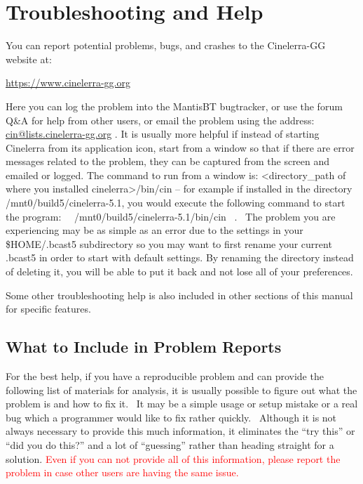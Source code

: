 \chapter{Troubleshooting and Help}%
\label{cha:troubleshooting_help}

You can report potential problems, bugs, and crashes to the Cinelerra-GG website at:
\medskip

\hspace{10mm}\href{https://www.cinelerra-gg.org/}{https://www.cinelerra-gg.org}
\medskip

Here you can log the problem into the MantisBT bugtracker, or use the forum Q\&A for help from other users, or email the
problem using the address: \href{mailto:cin@lists.cinelerra-gg.org}{cin@lists.cinelerra-gg.org} . It is usually more
helpful if instead of starting Cinelerra from its application icon, start from a window so that if there are error
messages related to the problem, they can be captured from the screen and emailed or logged. The command to run
from a window is: {\textless}directory\_path of where you installed cinelerra{\textgreater}/bin/cin -- for example if
installed in the directory /mnt0/build5/cinelerra-5.1, you would execute the following command to start the program:
\ \ /mnt0/build5/cinelerra-5.1/bin/cin \ . \ The problem you are experiencing may be as simple as an error due to the
settings in your \$HOME/.bcast5 subdirectory so you may want to first rename your current .bcast5 in order to start
with default settings. By renaming the directory instead of deleting it, you will be able to put it back and not lose
all of your preferences.
\medskip

Some other troubleshooting help is also included in other sections of this manual for specific features.

\section{What to Include in Problem Reports}%
\label{cha:What to Include in Problem Reports}
For the best help, if you have a reproducible problem and can provide the following list of materials for analysis, it
is usually possible to figure out what the problem is and how to fix it. \ It may be a simple usage or setup mistake or
a real bug which a programmer would like to fix rather quickly. \ Although it is not always necessary to provide this
much information, it eliminates the ``try this'' or ``did you do this?'' and a lot of ``guessing'' rather than heading
straight for a solution. \textcolor{red}{Even if you can not provide all of this information, please report the problem in case other users are having the same issue.}
\medskip

